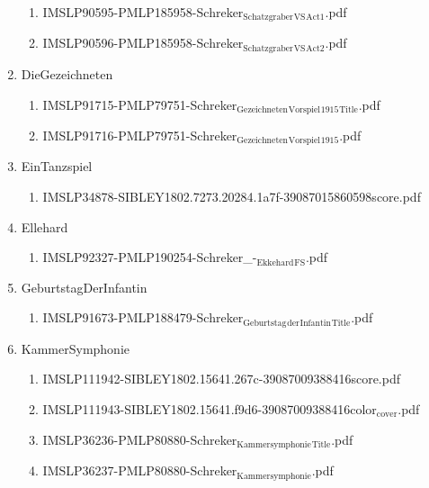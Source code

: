 \documentclass[11pt]{article}
\begin{document}
\begin{enumerate}
\begin{enumerate}
\item IMSLP90595-PMLP185958-Schreker$_{\text{Schatzgraber}}$$_{\text{VS}}$$_{\text{Act1}}$.pdf
\label{sec-1-1-1-1-44-59-3-3}

\item IMSLP90596-PMLP185958-Schreker$_{\text{Schatzgraber}}$$_{\text{VS}}$$_{\text{Act2}}$.pdf
\label{sec-1-1-1-1-44-59-3-4}
\end{enumerate}

\item DieGezeichneten
\label{sec-1-1-1-1-44-59-4}
\begin{enumerate}
\item IMSLP91715-PMLP79751-Schreker$_{\text{Gezeichneten}}$$_{\text{Vorspiel}}$$_{\text{1915}}$$_{\text{Title}}$.pdf
\label{sec-1-1-1-1-44-59-4-1}

\item IMSLP91716-PMLP79751-Schreker$_{\text{Gezeichneten}}$$_{\text{Vorspiel}}$$_{\text{1915}}$.pdf
\label{sec-1-1-1-1-44-59-4-2}
\end{enumerate}

\item EinTanzspiel
\label{sec-1-1-1-1-44-59-5}
\begin{enumerate}
\item IMSLP34878-SIBLEY1802.7273.20284.1a7f-39087015860598score.pdf
\label{sec-1-1-1-1-44-59-5-1}
\end{enumerate}

\item Ellehard
\label{sec-1-1-1-1-44-59-6}
\begin{enumerate}
\item IMSLP92327-PMLP190254-Schreker\_-$_{\text{Ekkehard}}$$_{\text{FS}}$.pdf
\label{sec-1-1-1-1-44-59-6-1}
\end{enumerate}

\item GeburtstagDerInfantin
\label{sec-1-1-1-1-44-59-7}
\begin{enumerate}
\item IMSLP91673-PMLP188479-Schreker$_{\text{Geburtstag}}$$_{\text{der}}$$_{\text{Infantin}}$$_{\text{Title}}$.pdf
\label{sec-1-1-1-1-44-59-7-1}
\end{enumerate}

\item KammerSymphonie
\label{sec-1-1-1-1-44-59-8}
\begin{enumerate}
\item IMSLP111942-SIBLEY1802.15641.267c-39087009388416score.pdf
\label{sec-1-1-1-1-44-59-8-1}

\item IMSLP111943-SIBLEY1802.15641.f9d6-39087009388416color$_{\text{cover}}$.pdf
\label{sec-1-1-1-1-44-59-8-2}

\item IMSLP36236-PMLP80880-Schreker$_{\text{Kammersymphonie}}$$_{\text{Title}}$.pdf
\label{sec-1-1-1-1-44-59-8-3}

\item IMSLP36237-PMLP80880-Schreker$_{\text{Kammersymphonie}}$.pdf
\label{sec-1-1-1-1-44-59-8-4}
\end{enumerate}
\end{enumerate}
\end{document}
